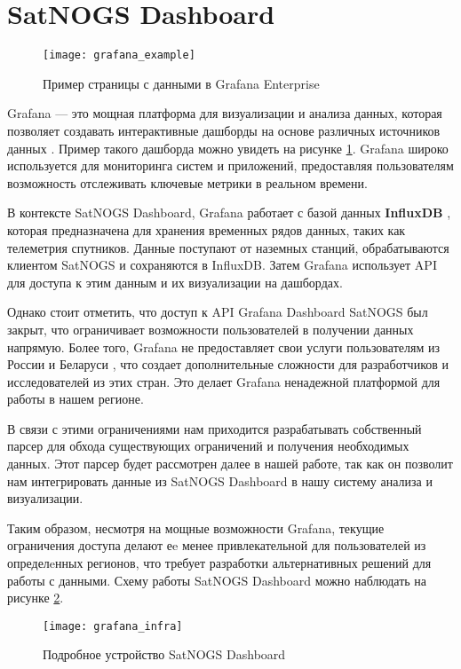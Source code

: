 \section{SatNOGS Dashboard}

\begin{figure}[htbp]
	\centering
	\texttt{[image: grafana\_example]}
	\caption{Пример страницы с данными в Grafana Enterprise}
	\label{fig:grafana_example}
\end{figure}

Grafana — это мощная платформа для визуализации и анализа данных, которая
позволяет создавать интерактивные дашборды на основе различных источников
данных \cite{grafana_docs}. Пример такого дашборда можно увидеть на рисунке
\ref{fig:grafana_example}.
Grafana широко используется для мониторинга систем и приложений, предоставляя
пользователям возможность отслеживать ключевые метрики в реальном времени.

В контексте SatNOGS Dashboard, Grafana работает с базой данных
\textbf{InfluxDB} \cite{influxdb_docs}, которая предназначена для хранения
временных рядов данных, таких как телеметрия спутников. Данные поступают от
наземных станций, обрабатываются клиентом SatNOGS и сохраняются в InfluxDB.
Затем Grafana использует API для доступа к этим данным и их визуализации на
дашбордах.

Однако стоит отметить, что доступ к API Grafana Dashboard SatNOGS был закрыт,
что ограничивает возможности пользователей в получении данных напрямую. Более
того, Grafana не предоставляет свои услуги пользователям из России и Беларуси
\cite{grafana_community_post}, что создает дополнительные сложности для
разработчиков и исследователей из этих стран. Это делает Grafana ненадежной
платформой для работы в нашем регионе.

В связи с этими ограничениями нам приходится разрабатывать собственный парсер
для обхода существующих ограничений и получения необходимых данных. Этот парсер
будет рассмотрен далее в нашей работе, так как он позволит нам интегрировать
данные из SatNOGS Dashboard в нашу систему анализа и визуализации.

Таким образом, несмотря на мощные возможности Grafana, текущие ограничения
доступа делают еe менее привлекательной для пользователей из определeнных
регионов, что требует разработки альтернативных решений для работы с данными.
Схему работы SatNOGS Dashboard можно наблюдать на рисунке
\ref{fig:grafana_infra}.

\begin{figure}[htbp]
	\centering
	\texttt{[image: grafana\_infra]}
	\caption{Подробное устройство SatNOGS Dashboard}
	\label{fig:grafana_infra}
\end{figure}

